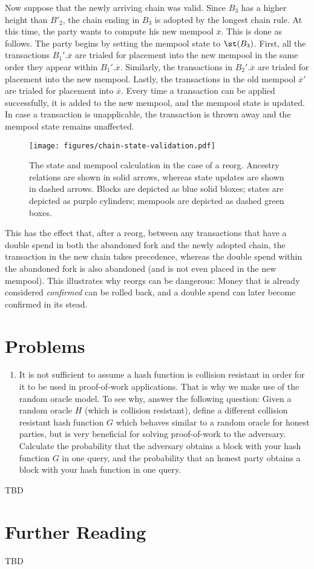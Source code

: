 Now suppose that the newly arriving chain was valid. Since $B_3$ has a higher height than $B'_2$,
the chain ending in
$B_3$ is adopted by the longest chain rule.
At this time, the party wants to compute his new mempool $\overline{x}$.
This is done as follows. The party begins by setting the mempool state to $\st(B_3)$.
First, all the transactions $B_1'.\overline{x}$ are trialed for placement into the new
mempool in the same order they appear within $B_1'.\overline{x}$. Similarly, the
transactions in $B_2'.\overline{x}$ are trialed for placement into the new mempool.
Lastly, the transactions in the old mempool $\overline{x}'$ are trialed for placement
into $\overline{x}$. Every time a transaction can be applied successfully, it is
added to the new mempool, and the mempool state is updated. In case a transaction
is unapplicable, the transaction is thrown away and the mempool state remains unaffected.

\begin{figure}[h]
    \centering
    \texttt{[image: figures/chain-state-validation.pdf]}
    \caption{The state and mempool calculation in the case of a reorg. Ancestry relations
             are shown in solid arrows, whereas state updates are shown in dashed arrows.
             Blocks are depicted as blue solid bloxes; states are depicted as purple cylinders;
             mempools are depicted as dashed green boxes.}
    \label{fig.chain-state-validation}
\end{figure}

This has the effect that, after a reorg, between any transactions that have a double spend in both
the abandoned fork and the newly adopted chain, the transaction in the new
chain takes precedence, whereas the double spend within the abandoned fork is also abandoned
(and is not even placed in the new mempool). This illustrates why reorgs can be dangerous:
Money that is already considered \emph{confirmed} can be rolled back, and a double spend can later
become confirmed in its stead.


\section{Problems}

\begin{enumerate}
  \item It is not sufficient to assume a hash function is collision resistant in order
  for it to be used in proof-of-work applications. That is why we make use of
  the random oracle model. To see why, answer the following question:
  Given a random oracle $H$ (which is collision resistant), define a different
  collision resistant hash function $G$ which behaves similar to a random oracle
  for honest parties, but is very beneficial for solving proof-of-work
  to the adversary. Calculate the probability that the adversary obtains a
  block with your hash function $G$ in one query, and the probability that
  an honest party obtains a block with your hash function in one query.
\end{enumerate}
TBD

\section{Further Reading}

TBD
